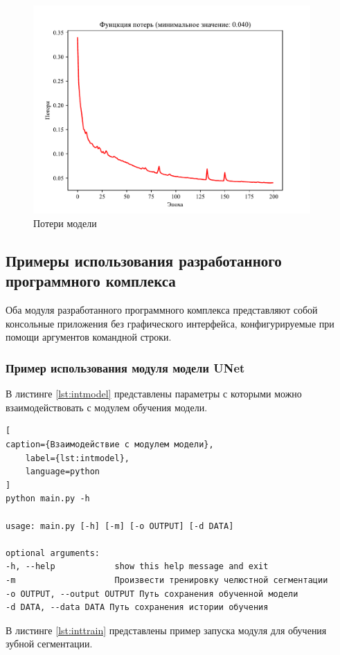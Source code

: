 \begin{figure}[H]
	\centering
	\includegraphics[width=400px]{img/loss.pdf}
	\caption{Потери модели}
	\label{fig:loss}
\end{figure}

\subsection{Примеры использования разработанного программного комплекса}

Оба модуля разработанного программного комплекса представляют собой консольные приложения без графического интерфейса, конфигурируемые при помощи аргументов командной строки.

\subsubsection{Пример использования модуля модели UNet}

В листинге \ref{lst:intmodel} представлены параметры с которыми можно взаимодействовать с модулем обучения модели.

\begin{lstlisting}[
caption={Взаимодействие с модулем модели},
	label={lst:intmodel},
	language=python
]
python main.py -h

usage: main.py [-h] [-m] [-o OUTPUT] [-d DATA]

optional arguments:
-h, --help            show this help message and exit
-m                    Произвести тренировку челюстной сегментации
-o OUTPUT, --output OUTPUT Путь сохранения обученной модели
-d DATA, --data DATA Путь сохранения истории обучения
\end{lstlisting}

В листинге \ref{lst:inttrain} представлены пример запуска модуля для обучения зубной сегментации.

